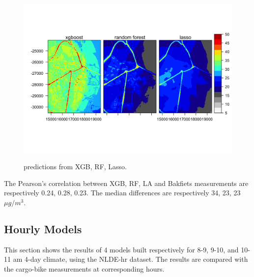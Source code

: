 \documentclass{article}
\begin{document}
\begin{figure}[H]
    \includegraphics[width=\linewidth]{NLDE.png}
    \label{nldepred}
    \caption {predictions from XGB,  RF,  Lasso.}
\end{figure}

 
The Pearson's correlation between  XGB,  RF, LA  and Bakfiets measurements are respectively 0.24, 0.28, 0.23. The median differences are respectively 34, 23, 23 $\mu g/m^3$. 

 


\subsection{Hourly Models}
This section shows the results of 4 models built respectively for 8-9, 9-10, and 10-11 am 4-day climate, using the NLDE-hr dataset. The results are compared with the cargo-bike measurements at corresponding hours.  
 
\end{document}
